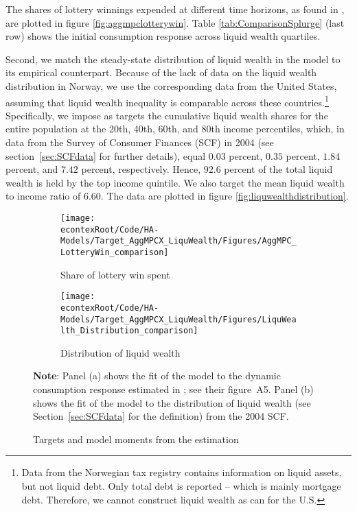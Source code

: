 \documentclass[\econtexRoot/HAFiscal]{subfiles}
\begin{document}
The shares of lottery winnings expended at different time horizons, as found in \citet{fagereng2021mpc}, are plotted in figure \ref{fig:aggmpclotterywin}. Table \ref{tab:ComparisonSplurge} (last row) shows the initial consumption response across liquid wealth quartiles. 

Second, we match the steady-state distribution of liquid wealth in the model to its empirical counterpart. Because of the lack of data on the liquid wealth distribution in Norway, we use the corresponding data from the United States, assuming that liquid wealth inequality is comparable across these countries.\footnote{Data from the Norwegian tax registry contains information on liquid assets, but not liquid debt. Only total debt is reported -- which is mainly mortgage debt. Therefore, we cannot construct liquid wealth as \citet{kaplan2014model} can for the U.S. \notinsubfile{\label{foot:liqwealth}}} 
Specifically, we impose as targets the cumulative liquid wealth shares for the entire population at the 20th, 40th, 60th, and 80th income percentiles, which, in data from the Survey of Consumer Finances (SCF) in 2004 (see section~\ref{sec:SCFdata} for further details), equal $0.03$ percent, $0.35$ percent, $1.84$ percent, and $7.42$ percent, respectively. Hence, $92.6$ percent of the total liquid wealth is held by the top income quintile. We also target the mean liquid wealth to income ratio of 6.60. The data are plotted in figure \ref{fig:liquwealthdistribution}.

\begin{figure}[htb]
  \centering
  \begin{subfigure}[b]{.48\linewidth}
    \centering
    \texttt{[image: \\econtexRoot/Code/HA-Models/Target\_AggMPCX\_LiquWealth/Figures/AggMPC\_LotteryWin\_comparison]}
    \caption{Share of lottery win spent}
    \notinsubfile{\label{fig:aggmpclotterywin}}
  \end{subfigure}
  \begin{subfigure}[b]{.48\linewidth}
    \centering
    \texttt{[image: \\econtexRoot/Code/HA-Models/Target\_AggMPCX\_LiquWealth/Figures/LiquWealth\_Distribution\_comparison]}
    \caption{Distribution of liquid wealth}
    \notinsubfile{\label{fig:liquwealthdistribution}}
  \end{subfigure}%
  \caption{Targets and model moments from the estimation}
  \notinsubfile{\label{fig:splurge_estimation}}
  \parbox{16cm}{\small \vspace{.15cm} \textbf{Note}: Panel (a) shows the fit of the model to the dynamic consumption response estimated in \citet{fagereng2021mpc}; see their figure~A5. Panel (b) shows the fit of the model to the distribution of liquid wealth (see Section~\ref{sec:SCFdata} for the definition) from the 2004 SCF.\normalsize}
\end{figure}
\end{document}
